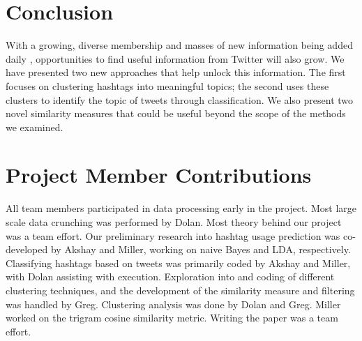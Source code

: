 \section{Conclusion}
With a growing, diverse membership and masses of new information being added daily \cite{Holt2011}, opportunities to find useful information from Twitter will also grow. We have presented two new approaches that help unlock this information. The first focuses on clustering hashtags into meaningful topics; the second uses these clusters to identify the topic of tweets through classification. We also present two novel similarity measures that could be useful beyond the scope of the methods we examined. 


\section{Project Member Contributions}
All team members participated in data processing early in the project.  Most large scale data crunching was performed by Dolan. Most theory behind our project was a team effort.  Our preliminary research into hashtag usage prediction was co-developed by Akshay and Miller, working on naive Bayes and LDA, respectively.  Classifying hashtags based on tweets was primarily coded by Akshay and Miller, with Dolan assisting with execution. Exploration into and coding of different clustering techniques, and the development of the similarity measure and filtering was handled by Greg. Clustering analysis was done by Dolan and Greg. Miller worked on the trigram cosine similarity metric. Writing the paper was a team effort.